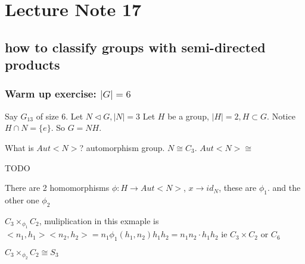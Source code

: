 \documentclass[11pt]{article}
\author{Fanping}
\date{\today}
\title{}
\begin{document}
\tableofcontents

\section{Lecture Note 17}
\label{sec:orgfa5b31e}
\subsection{how to classify groups with semi-directed products}
\label{sec:orgf735c4d}
\subsubsection{Warm up exercise: \(|G| = 6\)}
\label{sec:orgcf3e942}
Say \(G_{13}\) of size \(6\). Let \(N \lhd G, |N| = 3\)
Let \(H\) be a group, \(|H| = 2, H \subset G\).
Notice \(H \cap N = \{e\}\).
So \(G = NH\).

What is \(Aut<N>\)? automorphism group. \(N \cong C_3\).
\(Aut<N> \cong\)

TODO

There are 2 homomorphisms \(\phi: H \to Aut<N>\), \(x \to id_N\), these are \(\phi_1\).
and the other one \(\phi_2\)

\(C_3 \times_{\phi_1} C_2\), muliplication in this exmaple is
\(<n_1, h_1> <n_2, h_2> = n_1 \phi_1(h_1, n_2) h_1h_2 = n_1n_2 \cdot h_1h_2\)
ie \(C_3 \times C_2\) or \(C_6\)

\(C_3 \times_{\phi_2} C_2 \cong S_3\)
\end{document}
